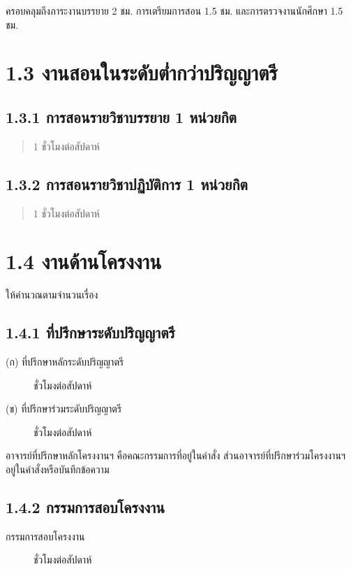 \documentclass[a4paper,12pt,english]{sphinxmanual}
\begin{document}
ครอบคลุมถึงภาระงานบรรยาย 2 ชม.
การเตรียมการสอน 1.5 ชม. และการตรวจงานนักศึกษา 1.5 ชม.


\section{1.3 งานสอนในระดับต่ำกว่าปริญญาตรี}
\label{\detokenize{1teaching:id11}}

\subsection{1.3.1 การสอนรายวิชาบรรยาย 1 หน่วยกิต}
\label{\detokenize{1teaching:id12}}\begin{quote}

1 ชั่วโมงต่อสัปดาห์
\end{quote}


\subsection{1.3.2 การสอนรายวิชาปฏิบัติการ 1 หน่วยกิต}
\label{\detokenize{1teaching:id13}}\begin{quote}

1 ชั่วโมงต่อสัปดาห์
\end{quote}


\section{1.4 งานด้านโครงงาน}
\label{\detokenize{1teaching:id14}}
ให้คำนวณตามจำนวนเรื่อง


\subsection{1.4.1 ที่ปรึกษาระดับปริญญาตรี}
\label{\detokenize{1teaching:id15}}\begin{description}
\item[{(ก) ที่ปรึกษาหลักระดับปริญญาตรี}]  ชั่วโมงต่อสัปดาห์

\item[{(ข) ที่ปรึกษาร่วมระดับปริญญาตรี}]  ชั่วโมงต่อสัปดาห์

\end{description}

อาจารย์ที่ปรึกษาหลักโครงงานฯ คือคณะกรรมการที่อยู่ในคำสั่ง ส่วนอาจารย์ที่ปรึกษาร่วมโครงงานฯ อยู่ในคำสั่งหรือบันทึกข้อความ


\subsection{1.4.2 กรรมการสอบโครงงาน}
\label{\detokenize{1teaching:id16}}\begin{description}
\item[{กรรมการสอบโครงงาน}]  ชั่วโมงต่อสัปดาห์

\end{description}
\end{document}
